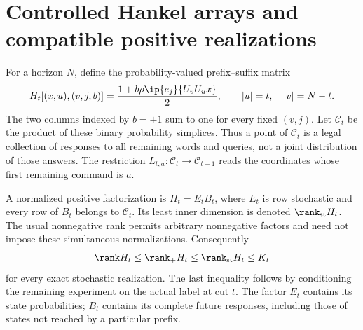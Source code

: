 \section{Controlled Hankel arrays and compatible positive realizations}\label{sec:hankel}
For a horizon $N$, define the probability-valued prefix--suffix matrix
\begin{equation}\label{eq:hankel}
 H_t[(x,u),(v,j,b)]
 =\frac{1+b\rho\ip{e_j}{U_vU_ux}}2,
 \qquad |u|=t,\quad |v|=N-t.
\end{equation}
The two columns indexed by $b=\pm1$ sum to one for every fixed $(v,j)$.
Let $\mathcal C_t$ be the product of these binary probability simplices.
Thus a point of $\mathcal C_t$ is a legal collection of responses to all
remaining words and queries, not a joint distribution of those answers.
The restriction $L_{t,a}:\mathcal C_t\to\mathcal C_{t+1}$ reads the
coordinates whose first remaining command is $a$.

A normalized positive factorization is $H_t=E_tB_t$, where $E_t$ is
row stochastic and every row of $B_t$ belongs to $\mathcal C_t$.
Its least inner dimension is denoted $\rank_{\mathrm{st}}H_t$.
The usual nonnegative rank permits arbitrary nonnegative factors and
need not impose these simultaneous normalizations. Consequently
\begin{equation}\label{eq:rank-chain}
 \rank H_t\le\rank_+H_t\le\rank_{\mathrm{st}}H_t\le K_t
\end{equation}
for every exact stochastic realization. The last inequality follows by
conditioning the remaining experiment on the actual label at cut $t$.
The factor $E_t$ contains its state probabilities; $B_t$ contains its
complete future responses, including those of states not reached by a
particular prefix.


